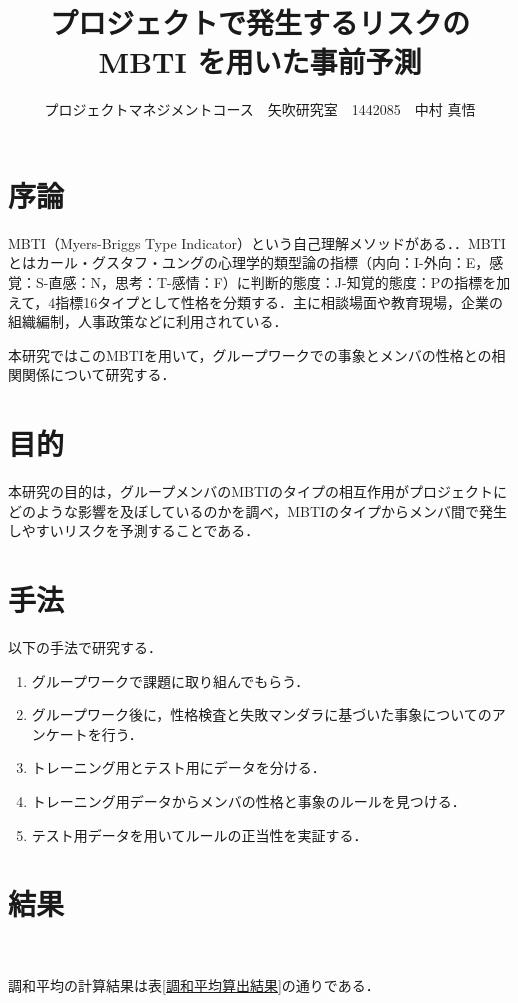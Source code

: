 \documentclass[uplatex,twocolumn,dvipdfmx]{jsarticle}
\title{\vspace{-5mm}\fontsize{14pt}{0pt}\selectfont プロジェクトで発生するリスクのMBTI を用いた事前予測}
\author{\normalsize プロジェクトマネジメントコース　矢吹研究室　1442085　中村 真悟}
\date{}
\begin{document}
\fontsize{10.5pt}{\baselineskip}\selectfont
\maketitle





\section{序論}\label{序論}
MBTI（Myers-Briggs Type Indicator）という自己理解メソッドがある．．MBTIとはカール・グスタフ・ユングの心理学的類型論の指標（内向：I-外向：E，感覚：S-直感：N，思考：T-感情：F）に判断的態度：J-知覚的態度：Pの指標を加えて，4指標16タイプとして性格を分類する．主に相談場面や教育現場，企業の組織編制，人事政策などに利用されている\cite{110001230195}．


本研究ではこのMBTIを用いて，グループワークでの事象とメンバの性格との相関関係について研究する．

\section{目的}

本研究の目的は，グループメンバのMBTIのタイプの相互作用がプロジェクトにどのような影響を及ぼしているのかを調べ，MBTIのタイプからメンバ間で発生しやすいリスクを予測することである．
\section{手法}

以下の手法で研究する．
\begin{enumerate}
\item グループワークで課題に取り組んでもらう．
\item グループワーク後に，性格検査と失敗マンダラに基づいた事象についてのアンケートを行う．
\item トレーニング用とテスト用にデータを分ける．
\item トレーニング用データからメンバの性格と事象のルールを見つける．
\item テスト用データを用いてルールの正当性を実証する．
\end{enumerate}
\section{結果}　

調和平均の計算結果は表\ref{調和平均算出結果}の通りである．
\end{document}
